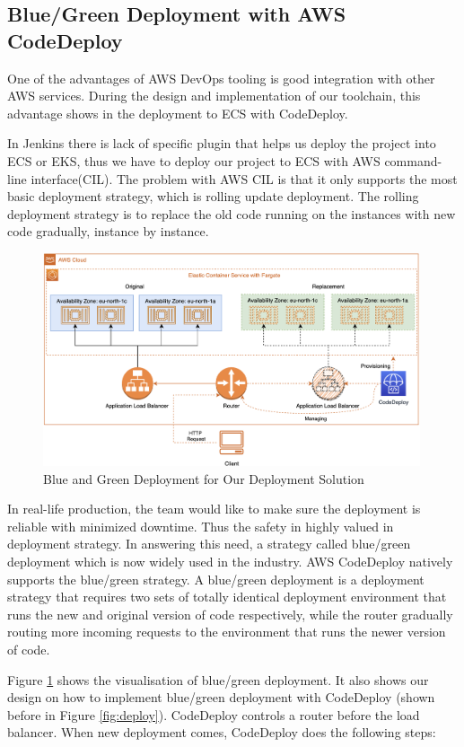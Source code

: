 \subsection{Blue/Green Deployment with AWS CodeDeploy}
One of the advantages of AWS DevOps tooling is good integration with other AWS services. During the design and implementation of our toolchain, this advantage shows in the deployment to ECS with CodeDeploy.
\par
In Jenkins there is lack of specific plugin that helps us deploy the project into ECS or EKS, thus we have to deploy our project to ECS with AWS command-line interface(CIL). The problem with AWS CIL is that it only supports the most basic deployment strategy, which is rolling update deployment. The rolling deployment strategy is to replace the old code running on the instances with new code gradually, instance by instance. 
\begin{figure}[h]
 \centering
 \includegraphics[width=0.99\textwidth]{pics/bg.png}
 \caption{Blue and Green Deployment for Our Deployment Solution}
 \label{fig:bg}
\end{figure}
\par
In real-life production, the team would like to make sure the deployment is reliable with minimized downtime. Thus the safety in highly valued in deployment strategy. In answering this need, a strategy called blue/green deployment which is now widely used in the industry. AWS CodeDeploy natively supports the blue/green strategy.
A blue/green deployment is a deployment strategy that requires two sets of totally identical deployment environment that runs the new and original version of code respectively, while the router gradually routing more incoming requests to the environment that runs the newer version of code. 
\par
Figure \ref{fig:bg} shows the visualisation of blue/green deployment. It also shows our design on how to implement blue/green deployment with CodeDeploy (shown before in Figure \ref{fig:deploy}). CodeDeploy controls a router before the load balancer. When new deployment comes, CodeDeploy does the following steps:
